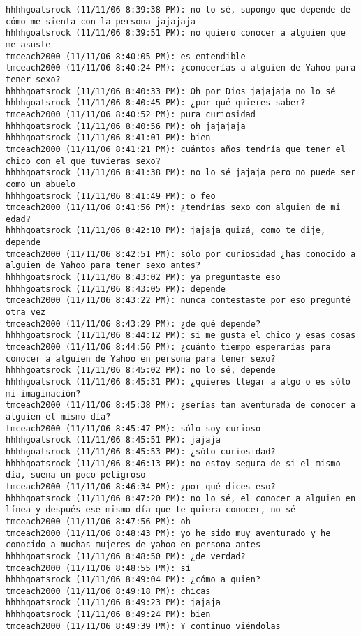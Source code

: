 \begin{verbatim}
hhhhgoatsrock (11/11/06 8:39:38 PM): no lo sé, supongo que depende de cómo me sienta con la persona jajajaja
hhhhgoatsrock (11/11/06 8:39:51 PM): no quiero conocer a alguien que me asuste
tmceach2000 (11/11/06 8:40:05 PM): es entendible
tmceach2000 (11/11/06 8:40:24 PM): ¿conocerías a alguien de Yahoo para tener sexo?
hhhhgoatsrock (11/11/06 8:40:33 PM): Oh por Dios jajajaja no lo sé
hhhhgoatsrock (11/11/06 8:40:45 PM): ¿por qué quieres saber?
tmceach2000 (11/11/06 8:40:52 PM): pura curiosidad
hhhhgoatsrock (11/11/06 8:40:56 PM): oh jajajaja
hhhhgoatsrock (11/11/06 8:41:01 PM): bien
tmceach2000 (11/11/06 8:41:21 PM): cuántos años tendría que tener el chico con el que tuvieras sexo?
hhhhgoatsrock (11/11/06 8:41:38 PM): no lo sé jajaja pero no puede ser como un abuelo
hhhhgoatsrock (11/11/06 8:41:49 PM): o feo
tmceach2000 (11/11/06 8:41:56 PM): ¿tendrías sexo con alguien de mi edad?
hhhhgoatsrock (11/11/06 8:42:10 PM): jajaja quizá, como te dije, depende
tmceach2000 (11/11/06 8:42:51 PM): sólo por curiosidad ¿has conocido a alguien de Yahoo para tener sexo antes?
hhhhgoatsrock (11/11/06 8:43:02 PM): ya preguntaste eso
hhhhgoatsrock (11/11/06 8:43:05 PM): depende
tmceach2000 (11/11/06 8:43:22 PM): nunca contestaste por eso pregunté otra vez
tmceach2000 (11/11/06 8:43:29 PM): ¿de qué depende?
hhhhgoatsrock (11/11/06 8:44:12 PM): si me gusta el chico y esas cosas
tmceach2000 (11/11/06 8:44:56 PM): ¿cuánto tiempo esperarías para conocer a alguien de Yahoo en persona para tener sexo?
hhhhgoatsrock (11/11/06 8:45:02 PM): no lo sé, depende
hhhhgoatsrock (11/11/06 8:45:31 PM): ¿quieres llegar a algo o es sólo mi imaginación?
tmceach2000 (11/11/06 8:45:38 PM): ¿serías tan aventurada de conocer a alguien el mismo día?
tmceach2000 (11/11/06 8:45:47 PM): sólo soy curioso
hhhhgoatsrock (11/11/06 8:45:51 PM): jajaja
hhhhgoatsrock (11/11/06 8:45:53 PM): ¿sólo curiosidad?
hhhhgoatsrock (11/11/06 8:46:13 PM): no estoy segura de si el mismo día, suena un poco peligroso
tmceach2000 (11/11/06 8:46:34 PM): ¿por qué dices eso?
hhhhgoatsrock (11/11/06 8:47:20 PM): no lo sé, el conocer a alguien en línea y después ese mismo día que te quiera conocer, no sé
tmceach2000 (11/11/06 8:47:56 PM): oh
tmceach2000 (11/11/06 8:48:43 PM): yo he sido muy aventurado y he conocido a muchas mujeres de yahoo en persona antes
hhhhgoatsrock (11/11/06 8:48:50 PM): ¿de verdad?
tmceach2000 (11/11/06 8:48:55 PM): sí
hhhhgoatsrock (11/11/06 8:49:04 PM): ¿cómo a quien?
tmceach2000 (11/11/06 8:49:18 PM): chicas
hhhhgoatsrock (11/11/06 8:49:23 PM): jajaja
hhhhgoatsrock (11/11/06 8:49:24 PM): bien
tmceach2000 (11/11/06 8:49:39 PM): Y continuo viéndolas

\end{verbatim}
